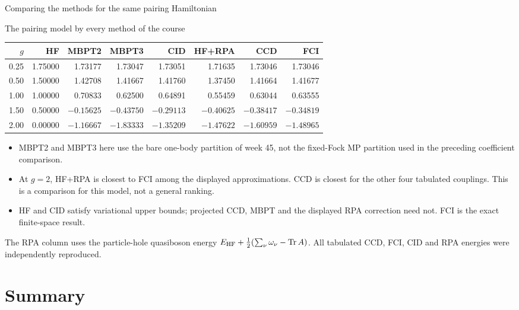 \documentclass[aspectratio=169,10pt]{beamer}
\begin{document}
\begin{frame}{Comparing the methods for the same pairing Hamiltonian}
\small
\begin{block}{The pairing model by every method of the course}
\centering\small\setlength{\tabcolsep}{5pt}
\begin{tabular}{@{}rrrrrrrr@{}}
\toprule
$g$ & HF & MBPT2 & MBPT3 & CID & HF+RPA & CCD & FCI\\
\midrule
0.25 & 1.75000 & 1.73177 & 1.73047 & 1.73051 & 1.71635 & 1.73046 & 1.73046\\
0.50 & 1.50000 & 1.42708 & 1.41667 & 1.41760 & 1.37450 & 1.41664 & 1.41677\\
1.00 & 1.00000 & 0.70833 & 0.62500 & 0.64891 & 0.55459 & 0.63044 & 0.63555\\
1.50 & 0.50000 & $-0.15625$ & $-0.43750$ & $-0.29113$ & $-0.40625$ & $-0.38417$ & $-0.34819$\\
2.00 & 0.00000 & $-1.16667$ & $-1.83333$ & $-1.35209$ & $-1.47622$ & $-1.60959$ & $-1.48965$\\
\bottomrule
\end{tabular}
\end{block}
\begin{itemize}
\item MBPT2 and MBPT3 here use the bare one-body partition of week 45, not the fixed-Fock MP partition used in the preceding coefficient comparison.
\item At $g=2$, HF+RPA is closest to FCI among the displayed approximations. CCD is closest for the other four tabulated couplings. This is a comparison for this model, not a general ranking.
\item HF and CID satisfy variational upper bounds; projected CCD, MBPT and the displayed RPA correction need not. FCI is the exact finite-space result.
\end{itemize}
\small The RPA column uses the particle-hole quasiboson energy $E_{\rm HF}+\tfrac12(\sum_\nu\omega_\nu-\mathrm{Tr}\,A)$. All tabulated CCD, FCI, CID and RPA energies were independently reproduced.
\end{frame}

\section{Summary}
\end{document}
